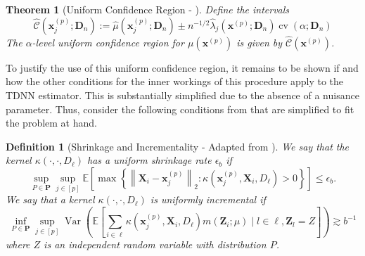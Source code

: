 \documentclass[letterpaper,10pt]{article}
\numberwithin{equation}{section}
\newtheorem{thm}{Theorem}
\numberwithin{thm}{section}
\newtheorem{dfn}{Definition}
\renewcommand{\hat}{\widehat}
\newcommand{\1}{\mathbb{1}}
\begin{document}
\vspace{0.5cm}
\begin{thm}[Uniform Confidence Region - \citet{ritzwoller_uniform_2024}]
	Define the intervals
	\begin{equation}
		\hat{\mathcal{C}}\left(\mathbf{x}^{(p)}_j; \mathbf{D}_n\right)
		:= \hat{\mu}\left(\mathbf{x}^{(p)}_{j}; \mathbf{D}_n\right) \pm
		n^{-1/2} \hat{\lambda}_{j}\left(\mathbf{x}^{(p)}; \mathbf{D}_n\right)\operatorname{cv}\left(\alpha; \mathbf{D}_n\right)
	\end{equation}
	The $\alpha$-level uniform confidence region for $\mu\left(\mathbf{x}^{(p)}\right)$ is given by $\hat{\mathcal{C}}\left(\mathbf{x}^{(p)}\right)$.
\end{thm}

To justify the use of this uniform confidence region, it remains to be shown if and how the other conditions for the inner workings of this procedure apply to the TDNN estimator.
This is substantially simplified due to the absence of a nuisance parameter.
Thus, consider the following conditions from \cite{ritzwoller_uniform_2024} that are simplified to fit the problem at hand.

\vspace{0.5cm}
\begin{dfn}[Shrinkage and Incrementality - Adapted from \citet{ritzwoller_uniform_2024}]
	We say that the kernel $\kappa\left(\cdot, \cdot, D_{\ell}\right)$ has a uniform shrinkage rate $\epsilon_b$ if
	\begin{equation}
		\sup_{P \in \mathbf{P}} \sup_{j \in[p]}
		\mathbb{E}\left[\max \left\{\left\|\mathbf{X}_i-\mathbf{x}^{(p)}_{j}\right\|_{2}: \kappa\left(\mathbf{x}^{(p)}_{j}, \mathbf{X}_i, D_{\ell}\right)>0\right\}\right]
		\leq \epsilon_b .
	\end{equation}
	We say that a kernel $\kappa\left(\cdot, \cdot, D_{\ell}\right)$ is uniformly incremental if
	\begin{equation}
		\inf_{P \in \mathbf{P}} \sup_{j \in[p]}
		\operatorname{Var}\left(\mathbb{E}\left[\sum_{i \in \ell} \kappa\left(\mathbf{x}^{(p)}_{j}, \mathbf{X}_i, D_{\ell}\right) m\left(\mathbf{Z}_i ; \mu\right) \mid l \in \ell, \mathbf{Z}_l = Z\right]\right)
		\gtrsim b^{-1}
	\end{equation}
	where $Z$ is an independent random variable with distribution $P$.
\end{dfn}
\end{document}
